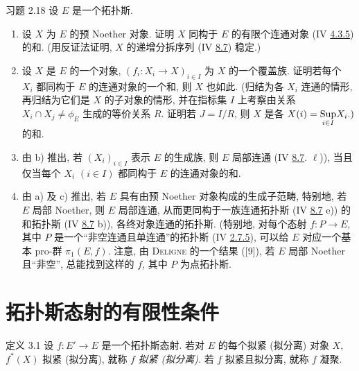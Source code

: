\begin{enonce*}[remark]{习题 2.18}
设 $E$ 是一个拓扑斯.
\begin{enumerate}
\renewcommand{\theenumi}{\alph{enumi}}
\renewcommand{\labelenumi}{\theenumi)}
\item 设 $X$ 为 $E$ 的预 Noether 对象.
证明 $X$ 同构于 $E$ 的有限个连通对象
(IV \hyperref[IV.subsubsec4.3.5]{4.3.5}) 的和.
(用反证法证明, $X$ 的递增分拆序列
(IV \hyperref[IV.exer8.7]{8.7}) 稳定.)

\item 设 $X$ 是 $E$ 的一个对象,
$(f_i : X_i \to X)_{i \in I}$ 为 $X$ 的一个覆盖族.
证明若每个 $X_i$ 都同构于 $E$ 的连通对象的一个和,
则 $X$ 也如此.
(归结为各 $X_i$ 连通的情形,
再归结为它们是 $X$ 的子对象的情形,
并在指标集 $I$ 上考察由关系 $X_i \cap X_j \neq \phi_E$
生成的等价关系 $R$.
证明若 $J = I/R$, 则 $X$ 是各
$X(i) = \displaystyle{\mathop{\operatorname{Sup}}_{i \in I}} X_i .)$ 的和.

\item 由 b) 推出,
若 $(X_i)_{i \in I}$ 表示 $E$ 的生成族,
则 $E$ 局部连通 (IV \hyperref[IV.exer8.7]{8.7}. $\ell$)),
当且\pageoriginale{}仅当每个 $X_i$ $(i \in I)$
都同构于 $E$ 的连通对象的和.

\item 由 a) 及 c) 推出,
若 $E$ 具有由预 Noether 对象构成的生成子范畴,
特别地, 若 $E$ 局部 Noether,
则 $E$ 局部连通,
从而更同构于一族连通拓扑斯
(IV \hyperref[IV.exer8.7]{8.7} e))
的和拓扑斯 (IV \hyperref[IV.exer8.7]{8.7} b)),
\ie 各终对象连通的拓扑斯.
(特别地, 对每个态射 $f : P \to E$,
其中 $P$ 是一个“非空连通且单连通”的拓扑斯
(IV \hyperref[IV.exer2.7.5]{2.7.5}),
可以给 $E$ 对应一个基本 pro-群 $\pi_1(E, f)$.
注意, 由 \textsc{Deligne} 的一个结果 ([9]),
若 $E$ 局部 Noether 且“非空”,
总能找到这样的 $f$, 其中 $P$ 为点拓扑斯.
\end{enumerate}
\end{enonce*}



\section{拓扑斯态射的有限性条件}

\begin{enonce*}{定义 3.1}
设 $f:E'\to E$ 是一个拓扑斯态射.
若对 $E$ 的每个拟紧 (\resp 拟分离) 对象 $X$,
$f^{\ast}(X)$ 拟紧 (\resp 拟分离),
就称 $f$ \emph{拟紧 (\resp 拟分离)}.
若 $f$ 拟紧且拟分离, 就称 $f$ 凝聚.
\end{enonce*}

